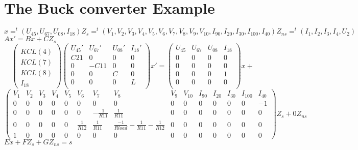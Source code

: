 \section{The Buck converter Example}
\begin{figure}[h]
\centerline{
 \scalebox{1.0}{
    
 }
}\end{figure}
$x=^{t}(U_{45},U_{67},U_{08},I_{18}) Z_{s}=^{t}(V_{1},V_{2},V_{3},V_{4},V_{5},V_{6},V_{7},V_{8},V_{9},V_{10},I_{90},I_{20},I_{30},I_{100},I_{40})
Z_{ns}=^{t}(I_{1},I_{2},I_{3},I_{4},U_{2})$\\
\underline{$Ax'= Bx+CZ_{s}$}
\[\left(\begin{array}{c}
  \\
KCL(4)\\KCL(7)\\KCL(8)\\I_{18}
\end{array}\right)
\left(\begin{array}{cccc}
  U_{45}'&U_{67}'&U_{08}'&I_{18}'\\
  \hline
  C21&0&0&0\\
  0&-C11&0&0\\
  0&0&C&0\\
  0&0&0&L\\  
\end{array}\right)x'=
\left(\begin{array}{cccc}
  U_{45}&U_{67}&U_{08}&I_{18}\\
  \hline
  0&0&0&0\\
  0&0&0&0\\
  0&0&0&1\\
  0&0&0&0\\
\end{array}\right)x+\]
\[
\left(\begin{array}{ccccccccccccccc}
  V_{1}&V_{2}&V_{3}&V_{4}&V_{5}&V_{6}&V_{7}&V_{8}&V_{9}&V_{10}&I_{90}&I_{20}&I_{30}&I_{100}&I_{40}\\
  \hline
  0&0&0&0&0&0&0&0&0&0&0&0&0&0&-1\\
  0&0&0&0&0&0&-\frac{1}{R11}&\frac{1}{R11}&0&0&0&0&0&0&0\\
  0&0&0&0&0&\frac{1}{R12}&\frac{1}{R11}&\frac{-1}{Rload}-\frac{1}{R11}-\frac{1}{R12}&0&0&0&0&0&0&0\\
  1&0&0&0&0&0&0&0&0&0&0&0&0&0&0
\end{array}\right)Z_{s}+0Z_{ns}\]
\underline{$Ex+FZ_{s}+GZ_{ns}=s$}
